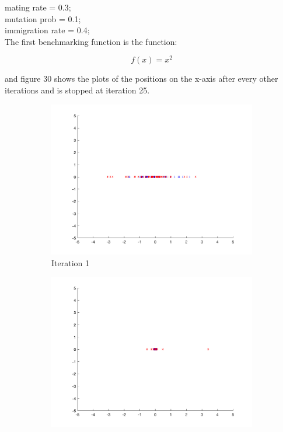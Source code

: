 mating rate = 0.3;\\
mutation prob = 0.1;\\

immigration rate = 0.4;\\

The first benchmarking function is the function:

$$
  f(x) = x^2
$$

and figure 30 shows the plots of the positions on the x-axis after every other iterations and is stopped at iteration 25.

\begin{figure}
  \begin{subfigure}[b]{0.4\textwidth}
    \includegraphics[width=\textwidth]{img/smpl/circ/loa-iter-1}
    \caption{Iteration 1}
    \label{fig:s1-iter-0}
  \end{subfigure}
  \begin{subfigure}[b]{0.4\textwidth}
    \includegraphics[width=\textwidth]{img/smpl/circ/loa-iter-4}

\end{subfigure}
\end{figure}
